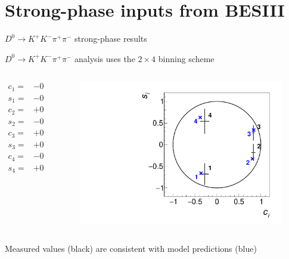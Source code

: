 \documentclass[xcolor={dvipsnames}]{beamer}
\begin{document}
\section{Strong-phase inputs from BESIII}
\begin{frame}{$D^0\to K^+K^-\pi^+\pi^-$ strong-phase results}
  \begin{center}
    $D^0\to K^+K^-\pi^+\pi^-$ analysis uses the $2\times4$ binning scheme
  \end{center}
  \vspace{0.0cm}
  \begin{columns}
    \begin{column}{0.5\textwidth}
      \vspace{-0.5cm}
      \begin{align*}
        c_1 =& -0.28 \pm 0.09 \pm 0.01 \\
        s_1 =& -0.68 \pm 0.24 \pm 0.04 \\
        c_2 =& +0.83 \pm 0.04 \pm 0.01 \\
        s_2 =& -0.18 \pm 0.19 \pm 0.03 \\
        c_3 =& +0.83 \pm 0.03 \pm 0.01 \\
        s_3 =& +0.27 \pm 0.17 \pm 0.03 \\
        c_4 =& -0.28 \pm 0.10 \pm 0.01 \\
        s_4 =& +0.54 \pm 0.28 \pm 0.04
      \end{align*}
    \end{column}
    \begin{column}{0.5\textwidth}
      \begin{figure}
        \centering
        \includegraphics[width=1.0\textwidth]{Plots/cisi_FitResults_Model.pdf}
      \end{figure}
    \end{column}
  \end{columns}
  \begin{center}
    Measured values (black) are consistent with model predictions (blue)
  \end{center}
\end{frame}
\end{document}

